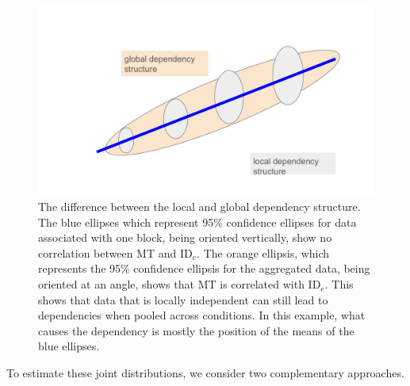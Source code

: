 \documentclass[acmlarge, manuscript,review]{acmart}
\newcommand{\ide}{\ensuremath{{\text{ID}_e}}\xspace}
\begin{document}
\begin{figure}[htbp]
	\centering
	\includegraphics[width=.8\textwidth]{tmp.pdf}
	\caption{The difference between the local and global dependency structure. The blue ellipses which represent 95\% confidence ellipses for data associated with one block, being oriented vertically, show no correlation between MT and \ide. The orange ellipsis, which represents the 95\% confidence ellipsis for the aggregated data, being oriented at an angle, shows that MT is correlated with \ide. This shows that data that is locally independent can still lead to dependencies when pooled across conditions. In this example, what causes the dependency is mostly the position of the means of the blue ellipses.}
	\label{fig:global_local_dep}
\end{figure}

To estimate these joint distributions, we consider two complementary approaches.
\end{document}
